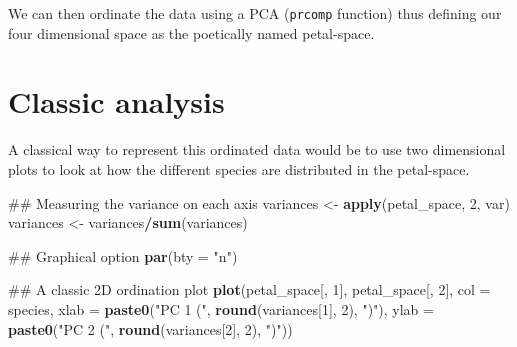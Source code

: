 \documentclass[]{book}
\newenvironment{Shaded}{\begin{snugshade}}{\end{snugshade}}
\newcommand{\KeywordTok}[1]{\textcolor[rgb]{0.13,0.29,0.53}{\textbf{#1}}}
\newcommand{\DataTypeTok}[1]{\textcolor[rgb]{0.13,0.29,0.53}{#1}}
\newcommand{\DecValTok}[1]{\textcolor[rgb]{0.00,0.00,0.81}{#1}}
\newcommand{\StringTok}[1]{\textcolor[rgb]{0.31,0.60,0.02}{#1}}
\newcommand{\OperatorTok}[1]{\textcolor[rgb]{0.81,0.36,0.00}{\textbf{#1}}}
\newcommand{\NormalTok}[1]{#1}
\theoremstyle{definition}
\theoremstyle{definition}
\theoremstyle{remark}
\begin{document}
We can then ordinate the data using a PCA (\texttt{prcomp} function)
thus defining our four dimensional space as the poetically named
petal-space.

\begin{Shaded}
\end{Shaded}

\section{Classic analysis}\label{classic-analysis}

A classical way to represent this ordinated data would be to use two
dimensional plots to look at how the different species are distributed
in the petal-space.

\begin{Shaded}
\begin{Highlighting}[]
\NormalTok{## Measuring the variance on each axis}
\NormalTok{variances <-}\StringTok{ }\KeywordTok{apply}\NormalTok{(petal_space, }\DecValTok{2}\NormalTok{, var)}
\NormalTok{variances <-}\StringTok{ }\NormalTok{variances}\OperatorTok{/}\KeywordTok{sum}\NormalTok{(variances)}

\NormalTok{## Graphical option}
\KeywordTok{par}\NormalTok{(}\DataTypeTok{bty =} \StringTok{"n"}\NormalTok{)}

\NormalTok{## A classic 2D ordination plot}
\KeywordTok{plot}\NormalTok{(petal_space[, }\DecValTok{1}\NormalTok{], petal_space[, }\DecValTok{2}\NormalTok{], }\DataTypeTok{col =}\NormalTok{ species,}
    \DataTypeTok{xlab =} \KeywordTok{paste0}\NormalTok{(}\StringTok{"PC 1 ("}\NormalTok{, }\KeywordTok{round}\NormalTok{(variances[}\DecValTok{1}\NormalTok{], }\DecValTok{2}\NormalTok{), }\StringTok{")"}\NormalTok{),}
    \DataTypeTok{ylab =} \KeywordTok{paste0}\NormalTok{(}\StringTok{"PC 2 ("}\NormalTok{, }\KeywordTok{round}\NormalTok{(variances[}\DecValTok{2}\NormalTok{], }\DecValTok{2}\NormalTok{), }\StringTok{")"}\NormalTok{))}
\end{Highlighting}
\end{Shaded}
\end{document}
